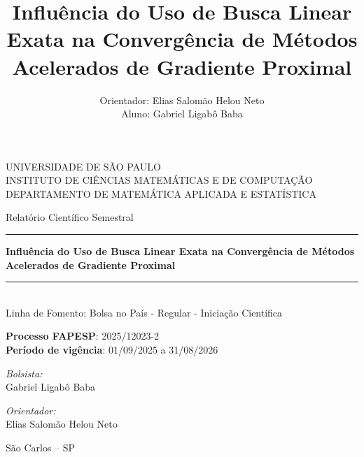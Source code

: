 \documentclass[12pt]{article}
\title{Influência do Uso de Busca Linear Exata na Convergência de Métodos Acelerados de Gradiente Proximal}
\author{Orientador: Elias Salomão Helou Neto\\Aluno: Gabriel Ligabô Baba}
\begin{document}
\begin{titlepage}
	\begin{center}
		{\large \sc UNIVERSIDADE DE SÃO PAULO} \\
		{\large \sc INSTITUTO DE CIÊNCIAS MATEMÁTICAS E DE COMPUTAÇÃO}\\[0.7cm]
		{\small \sc DEPARTAMENTO DE MATEMÁTICA APLICADA E ESTATÍSTICA}
		
		\vspace{4cm}
		
		{\large \sc Relatório Científico Semestral}\\
		\rule{\linewidth}{2pt}
		
		\vspace{0.7em}
		{\Large \bfseries Influência do Uso de Busca Linear Exata na Convergência de Métodos Acelerados de Gradiente Proximal}
		\vspace{0.2em}
		
		\rule{\linewidth}{2pt} \\
		{\small \sc Linha de Fomento: Bolsa no País - Regular - Iniciação Científica}
	\end{center}
	
	
	\vspace{1.8cm}
	
	\begin{flushleft}
		\textbf{Processo FAPESP}: 2025/12023-2\\
		\textbf{Período de vigência}: 01/09/2025 a 31/08/2026\\
	\end{flushleft}
	
	\vspace{1.8cm}
	
	\begin{minipage}{0.43\textwidth}
		\emph{Bolsista:}\\
		Gabriel Ligabô Baba
	\end{minipage}
	\hspace{1cm}
	\begin{minipage}{0.43\textwidth}
		\emph{Orientador:}\\
        Elias Salomão Helou Neto	
	\end{minipage}
	
	\vfill
	
	\begin{center}
		\makeatletter
		São Carlos -- SP \\
		\@date
		\makeatother
	\end{center}
\end{titlepage}
\end{document}
